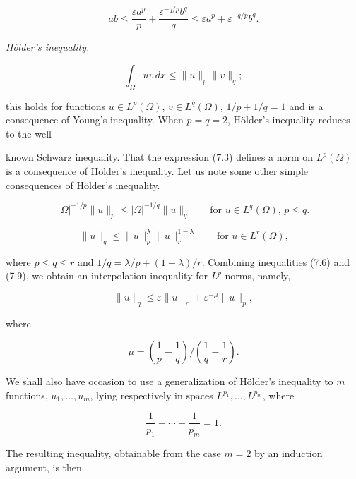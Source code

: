 \begin{equation}
\tag{7.6}
ab \leq \frac{\varepsilon a^p}{p} + \frac{\varepsilon^{-q/p}b^q}{q}
\leq \varepsilon a^p + \varepsilon^{-q/p}b^q.
\end{equation}

\textit{H\"older's inequality.}

\begin{equation}
\tag{7.7}
\int_\Omega uv\,dx \leq \|u\|_p \|v\|_q;
\end{equation}

this holds for functions $u \in L^p(\Omega)$, $v \in L^q(\Omega)$, $1/p + 1/q = 1$ and is a consequence of Young's inequality. When $p=q=2$, H\"older's inequality reduces to the well



known Schwarz inequality. That the expression (7.3) defines a norm on $L^p(\Omega)$
is a consequence of H\"older's inequality. Let us note some other simple consequences
of H\"older's inequality.

\begin{equation}
|\Omega|^{-1/p}\|u\|_p \le |\Omega|^{-1/q}\|u\|_q \qquad \text{for $u \in L^q(\Omega)$, \ $p \le q$.}
\tag{7.8}
\end{equation}

\begin{equation}
\|u\|_q \le \|u\|_p^\lambda \|u\|_r^{1-\lambda} \qquad \text{for $u \in L^r(\Omega)$,}
\tag{7.9}
\end{equation}

where $p \le q \le r$ and $1/q = \lambda/p + (1-\lambda)/r$.
Combining inequalities (7.6) and (7.9), we obtain an interpolation inequality for $L^p$
norms, namely,

\begin{equation}
\|u\|_q \le \varepsilon\|u\|_r + \varepsilon^{-\mu}\|u\|_p,
\tag{7.10}
\end{equation}

where

\[
\mu = \left(\frac{1}{p} - \frac{1}{q}\right)\bigg/\left(\frac{1}{q} - \frac{1}{r}\right).
\]

We shall also have occasion to use a generalization of H\"older's inequality to $m$
functions, $u_1,\ldots,u_m$, lying respectively in spaces $L^{p_1},\ldots,L^{p_m}$, where

\[
\frac{1}{p_1} + \cdots + \frac{1}{p_m} = 1.
\]

The resulting inequality, obtainable from the case $m = 2$ by an induction argument,
is then

